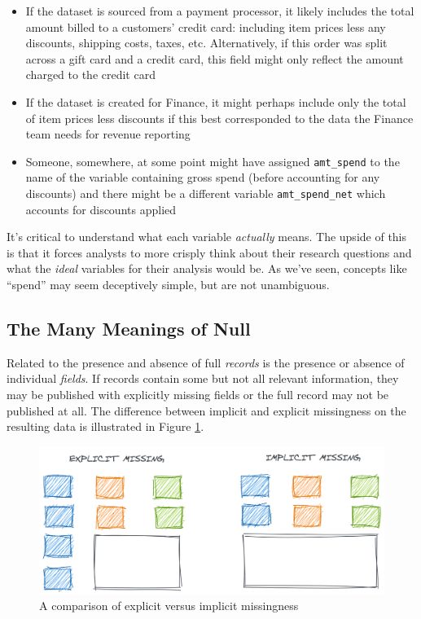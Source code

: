 \documentclass[
]{krantz}
\providecommand{\tightlist}{%
  \setlength{\itemsep}{0pt}\setlength{\parskip}{0pt}}
\begin{document}
\begin{itemize}
\tightlist
\item
  If the dataset is sourced from a payment processor, it likely includes the total amount billed to a customers' credit card: including item prices less any discounts, shipping costs, taxes, etc. Alternatively, if this order was split across a gift card and a credit card, this field might only reflect the amount charged to the credit card
\item
  If the dataset is created for Finance, it might perhaps include only the total of item prices less discounts if this best corresponded to the data the Finance team needs for revenue reporting
\item
  Someone, somewhere, at some point might have assigned \texttt{amt\_spend} to the name of the variable containing gross spend (before accounting for any discounts) and there might be a different variable \texttt{amt\_spend\_net} which accounts for discounts applied
\end{itemize}

It's critical to understand what each variable \emph{actually} means.
The upside of this is that it forces analysts to more crisply think about their research questions and what the \emph{ideal} variables for their analysis would be.
As we've seen, concepts like ``spend'' may seem deceptively simple, but are not unambiguous.

\hypertarget{the-many-meanings-of-null}{%
\subsection{The Many Meanings of Null}\label{the-many-meanings-of-null}}

Related to the presence and absence of full \emph{records} is the presence or absence of individual \emph{fields}.
If records contain some but not all relevant information, they may be published with explicitly missing fields or the full record may not be published at all. The difference between implicit and explicit missingness on the resulting data is illustrated in Figure \ref{fig:null-impl-expl}.

\begin{figure}

{\centering \includegraphics[width=0.9\linewidth]{figures/data-dall/missing-imp-exp} 

}

\caption{A comparison of explicit versus implicit missingness}\label{fig:null-impl-expl}
\end{figure}
\end{document}
